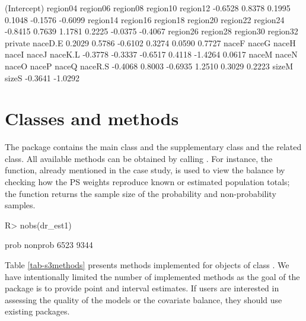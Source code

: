 \documentclass[
]{jss}
\begin{document}
\begin{CodeChunk}
\begin{CodeOutput}
(Intercept)    region04    region06    region08    region10    region12 
    -0.6528      0.8378      0.1995      0.1048     -0.1576     -0.6099 
   region14    region16    region18    region20    region22    region24 
    -0.8415      0.7639      1.1781      0.2225     -0.0375     -0.4067 
   region26    region28    region30    region32     private     naceD.E 
     0.2029      0.5786     -0.6102      0.3274      0.0590      0.7727 
      naceF       naceG       naceH       naceI       naceJ     naceK.L 
    -0.3778     -0.3337     -0.6517      0.4118     -1.4264      0.0617 
      naceM       naceN       naceO       naceP       naceQ     naceR.S 
    -0.4068      0.8003     -0.6935      1.2510      0.3029      0.2223 
      sizeM       sizeS 
    -0.3641     -1.0292 
\end{CodeOutput}
\end{CodeChunk}

\section[Classes and S3 methods]{Classes and  methods}\label{sec-s3methods}

The package contains the main class  and the supplementary
class  and the related 
class. All available  methods can be obtained by calling
. For instance, the
 function, already mentioned in the case study, is
used to view the balance by checking how the PS weights reproduce known
or estimated population totals; the  function returns the
sample size of the probability and non-probability samples.

\begin{CodeChunk}
\begin{CodeInput}
R> nobs(dr_est1)
\end{CodeInput}
\begin{CodeOutput}
   prob nonprob 
   6523    9344 
\end{CodeOutput}
\end{CodeChunk}

Table \ref{tab-s3methods} presents  methods implemented for
objects of class . We have intentionally limited the
number of implemented methods as the goal of the package is to provide
point and interval estimates. If users are interested in assessing the
quality of the models or the covariate balance, they should use existing
 packages.
\end{document}
